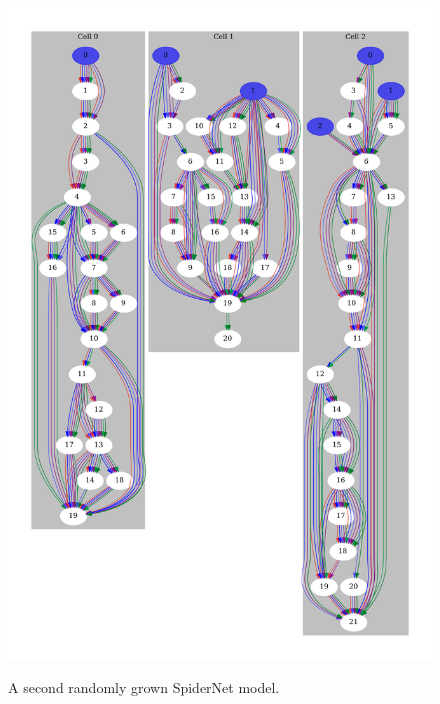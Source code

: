 \begin{figure}[ht]
    \centering
	\includegraphics[width=\linewidth, trim={0 1cm 0 1cm}, clip]{random-2-2} \\
    \caption[A second randomly grown SpiderNet model]{A second randomly grown SpiderNet model.}
    \label{fig:spider_rand1_example}
\end{figure}

